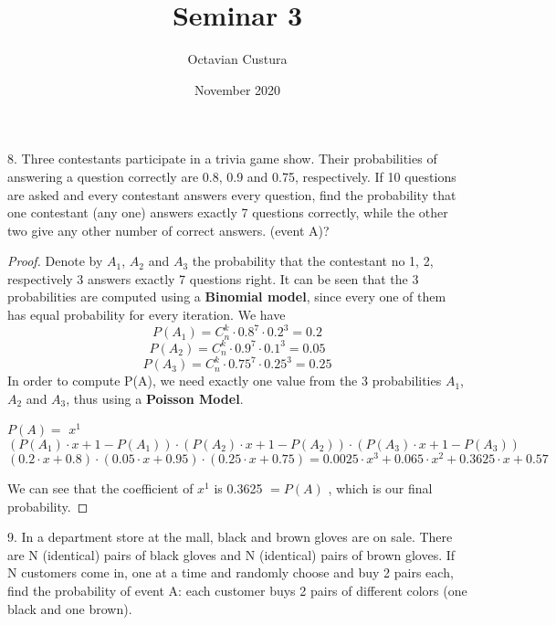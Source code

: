 \documentclass{article}
\title{Seminar 3}
\author{Octavian Custura}
\date{November 2020}
\begin{document}
\maketitle

8. Three contestants participate in a trivia game show. Their probabilities of answering a
question correctly are 0.8, 0.9 and 0.75, respectively. If 10 questions are asked and every contestant answers every question, find the probability that one contestant (any one) answers exactly
7 questions correctly, while the other two give any other number of correct answers. (event A)?
\begin{proof}
Denote by $A_{1}$, $A_{2}$ and ${A}_{3}$ the probability that the contestant no 1, 2, respectively 3 answers exactly 7 questions right. It can be seen that the 3 probabilities are computed using a \textbf{Binomial model}, since every one of them has equal probability for every iteration. We have 
\[ P({A}_{1}) = {C}^{k}_{n} \cdot {0.8}^{7} \cdot {0.2}^{3} = 0.2\]
\[ P({A}_{2}) = {C}^{k}_{n} \cdot {0.9}^{7} \cdot {0.1}^{3} = 0.05\]
\[ P({A}_{3}) = {C}^{k}_{n} \cdot {0.75}^{7} \cdot {0.25}^{3} = 0.25\]
In order to compute P(A), we need exactly one value from the 3 probabilities $A_{1}$, $A_{2}$ and ${A}_{3}$, thus using a \textbf{Poisson Model}.

$P(A) =$  ${x}^{1}$  $(P({A}_{1}) \cdot x + 1 - P({A}_{1})) \cdot (P({A}_{2}) \cdot x + 1 - P({A}_{2})) \cdot (P({A}_{3}) \cdot x + 1 - P({A}_{3}))$
\begin{equation}
    (0.2 \cdot x + 0.8) \cdot (0.05 \cdot x + 0.95) \cdot (0.25 \cdot x + 0.75) = 0.0025 \cdot {x}^{3} + 0.065 \cdot {x}^{2} + 0.3625 \cdot {x} + 0.57
\end{equation}

We can see that the coefficient of ${x}^{1}$ is 0.3625 $= P(A)$ , which is our final probability.
\end{proof}

9. In a department store at the mall, black and brown gloves are on sale. There are N (identical)
pairs of black gloves and N (identical) pairs of brown gloves. If N customers come in, one at a
time and randomly choose and buy 2 pairs each, find the probability of event A: each customer
buys 2 pairs of different colors (one black and one brown).
\end{document}
